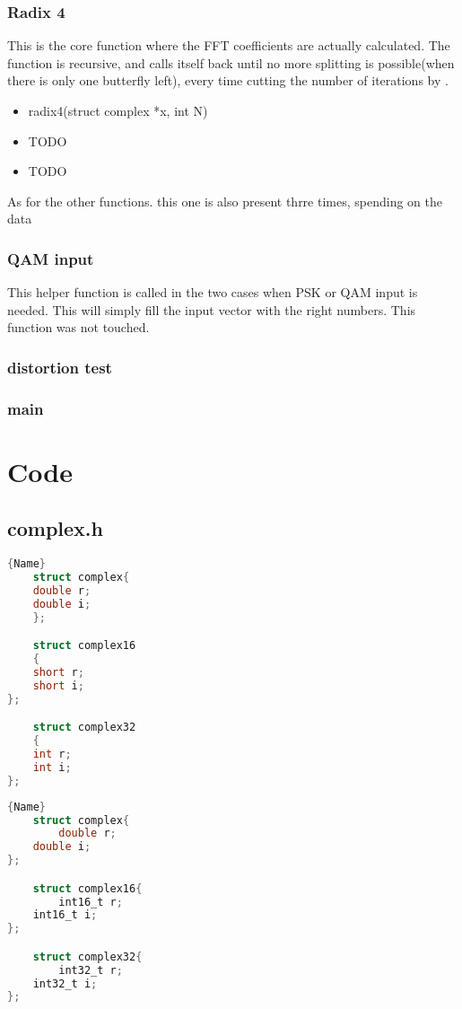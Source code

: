 \documentclass[a4paper]{article}
\begin{document}
\subsubsection{Radix 4}
This is the core function where the FFT coefficients are actually calculated. The function is recursive, and calls itself back until no more splitting is possible(when there is only one butterfly left), every time cutting the number of iterations by .
\begin{itemize}
	\item radix4(struct complex *x, int N)
	\item TODO
	\item TODO
\end{itemize}
As for the other functions. this one is also present thrre times, spending on the data

\subsubsection{QAM input}
This helper function is called in the two cases when PSK or QAM input is needed. This will simply fill the input vector with the right numbers. This function was not touched.
\subsubsection{distortion test}

\subsubsection{main}

\section{Code}
\subsection{complex.h}
\noindent\begin{minipage}{.45\textwidth}
    \begin{lstlisting}[caption=code 1 1,frame=tlrb, language=C]{Name}
    struct complex{
    double r;
    double i;
    };

    struct complex16
    {
    short r;
    short i;
};

    struct complex32
    {
    int r;
    int i;
};
    \end{lstlisting}
\end{minipage}\hfill
\begin{minipage}{.45\textwidth}
    \begin{lstlisting}[caption=code 2,frame=tlrb, language=C]{Name}
    struct complex{
        double r;
    double i;
};

    struct complex16{
        int16_t r;
    int16_t i;
};

    struct complex32{
        int32_t r;
    int32_t i;
};
    \end{lstlisting}
\end{minipage}
\end{document}
